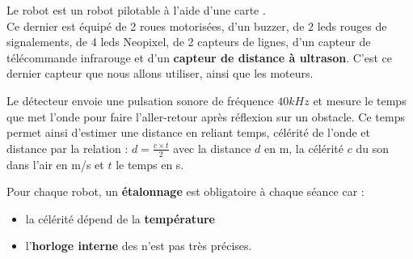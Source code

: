 Le robot \mq est un robot pilotable à l’aide d’une carte \mb.\\
Ce dernier est équipé de 2 roues motorisées, d’un buzzer, de 2 leds rouges de signalements, de 4 leds Neopixel, de 2 capteurs de lignes, d’un capteur de télécommande infrarouge et d’un \textbf{capteur de distance à ultrason}. C’est ce dernier capteur que nous allons utiliser, ainsi que les moteurs. 


Le détecteur envoie une pulsation sonore de fréquence $40 kHz$ et mesure le temps que met l'onde pour faire l’aller-retour après réflexion sur un obstacle. Ce temps permet ainsi d’estimer une distance en reliant temps, célérité de l’onde et distance par la relation : $d = \frac{c \times t}{2}$ avec la distance $d$ en m, la célérité $c$ du son dans l’air en m/s et $t$ le temps en s.

Pour chaque robot, un \textbf{étalonnage} est obligatoire à chaque séance car :
\begin{itemize}
    \item la célérité dépend de la \textbf{température}
    \item l’\textbf{horloge interne} des \mb n’est pas très précises.
\end{itemize}~\\


